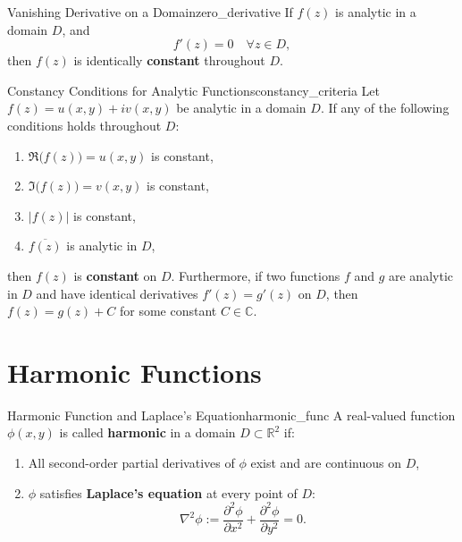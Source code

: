 \begin{theorem}{Vanishing Derivative on a Domain}{zero_derivative}
If $f(z)$ is analytic in a domain $D$, and
\begin{equation}
f'(z) = 0 \quad \forall z \in D,
\end{equation}
then $f(z)$ is identically \textbf{constant} throughout $D$.
\end{theorem}

\begin{proposition}{Constancy Conditions for Analytic Functions}{constancy_criteria}
Let $f(z) = u(x, y) + i v(x, y)$ be analytic in a domain $D$. If any of the following conditions holds throughout $D$:
\begin{enumerate}
    \item $\Re\big(f(z)\big) = u(x, y)$ is constant,
    \item $\Im\big(f(z)\big) = v(x, y)$ is constant,
    \item $|f(z)|$ is constant,
    \item $\overline{f(z)}$ is analytic in $D$,
\end{enumerate}
then $f(z)$ is \textbf{constant} on $D$.
Furthermore, if two functions $f$ and $g$ are analytic in $D$ and have identical derivatives $f'(z) = g'(z)$ on $D$, then $f(z) = g(z) + C$ for some constant $C \in \mathbb{C}$.
\end{proposition}


\section{Harmonic Functions}

\begin{definition}{Harmonic Function and Laplace's Equation}{harmonic_func}
A real-valued function $\phi(x, y)$ is called \textbf{harmonic} in a domain $D \subset \mathbb{R}^2$ if:
\begin{enumerate}
    \item All second-order partial derivatives of $\phi$ exist and are continuous on $D$,
    \item $\phi$ satisfies \textbf{Laplace's equation} at every point of $D$:
    \begin{equation}
    \nabla^2 \phi := \frac{\partial^2 \phi}{\partial x^2} + \frac{\partial^2 \phi}{\partial y^2} = 0.
    \end{equation}
\end{enumerate}
\end{definition}

